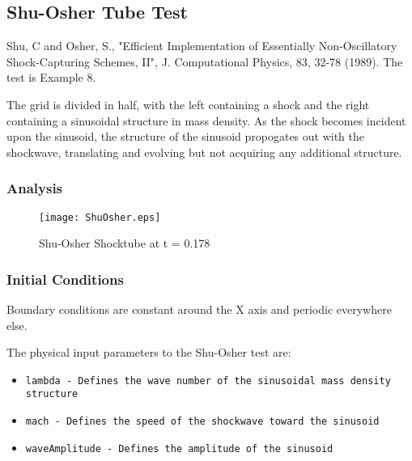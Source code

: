 

\subsection{Shu-Osher Tube Test}

Shu, C and Osher, S., "Efficient Implementation of Essentially Non-Oscillatory Shock-Capturing 
Schemes, II", J. Computational Physics, 83, 32-78 (1989). The test is Example 8. 

The grid is divided in half, with the left containing a shock and the right containing a sinusoidal 
structure in mass density. As the shock becomes incident upon the sinusoid, the structure of the 
sinusoid propogates out with the shockwave, translating and evolving but not acquiring any additional structure.

\subsubsection{Analysis}


\begin{figure*}
\begin{center}
\texttt{[image: ShuOsher.eps]}
\caption{Shu-Osher Shocktube at t = 0.178}
\end{center}
\end{figure*}

\subsubsection{Initial Conditions}

Boundary conditions are constant around the X axis and periodic everywhere else.

The physical input parameters to the Shu-Osher test are:
\begin{itemize}
\item \tt{lambda} - Defines the wave number of the sinusoidal mass density structure
\item \tt{mach} - Defines the speed of the shockwave toward the sinusoid
\item \tt{waveAmplitude} - Defines the amplitude of the sinusoid
\end{itemize}


